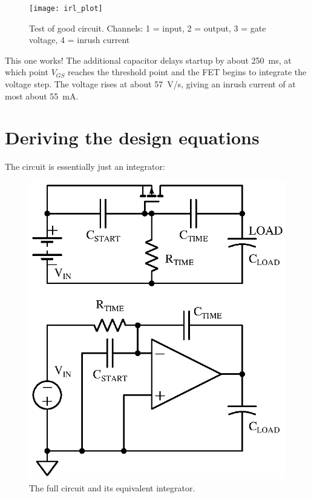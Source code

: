 \documentclass[letterpaper,12pt]{article}
\begin{document}
\begin{figure}[H]
\centering
\texttt{[image: irl\_plot]}
\caption{Test of good circuit. Channels: 1 = input, 2 = output, 3 = gate voltage, 4 = inrush current}
\end{figure}

This one works! The additional capacitor delays startup by about \SI{250}{ms}, at which
point $V_{GS}$ reaches the threshold point and the FET begins to integrate the voltage
step. The voltage rises at about \SI{57}{V/s}, giving an inrush current of at most
about \SI{55}{mA}.

\section{Deriving the design equations}
\label{sec:deriving}

The circuit is essentially just an integrator:

\begin{figure}[H]
\centering
\includegraphics{ckt_labeled}
\caption{The full circuit and its equivalent integrator.}
\end{figure}
\end{document}

